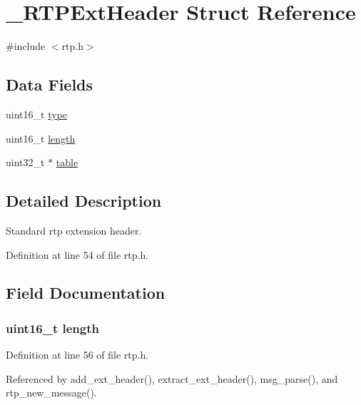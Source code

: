 \hypertarget{struct___r_t_p_ext_header}{\section{\+\_\+\+R\+T\+P\+Ext\+Header Struct Reference}
\label{struct___r_t_p_ext_header}
}


{\ttfamily \#include $<$rtp.\+h$>$}

\subsection*{Data Fields}
\begin{DoxyCompactItemize}
\item 
uint16\+\_\+t \hyperlink{struct___r_t_p_ext_header_acb5cfd209ba75c853d03f701e7f91679}{type}
\item 
uint16\+\_\+t \hyperlink{struct___r_t_p_ext_header_a1892eba2086d12ac2b09005aeb09ea3b}{length}
\item 
uint32\+\_\+t $\ast$ \hyperlink{struct___r_t_p_ext_header_a05be6af94bcc30c135e4b6089bf9cfd9}{table}
\end{DoxyCompactItemize}


\subsection{Detailed Description}
Standard rtp extension header. 

Definition at line 54 of file rtp.\+h.



\subsection{Field Documentation}
\hypertarget{struct___r_t_p_ext_header_a1892eba2086d12ac2b09005aeb09ea3b}{
\subsubsection[{length}]{\setlength{\rightskip}{0pt plus 5cm}uint16\+\_\+t length}}\label{struct___r_t_p_ext_header_a1892eba2086d12ac2b09005aeb09ea3b}


Definition at line 56 of file rtp.\+h.



Referenced by add\+\_\+ext\+\_\+header(), extract\+\_\+ext\+\_\+header(), msg\+\_\+parse(), and rtp\+\_\+new\+\_\+message().

